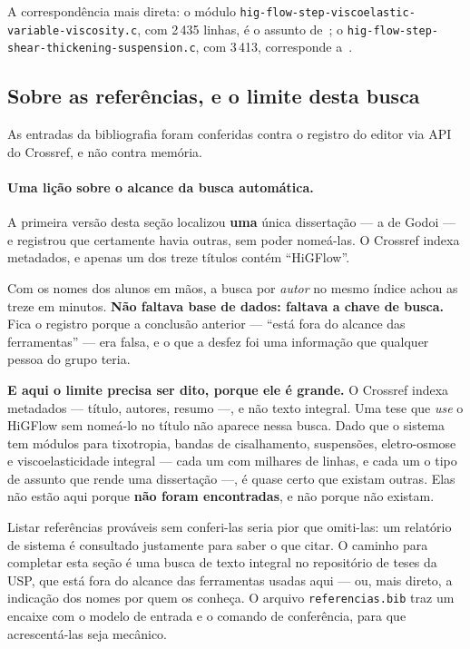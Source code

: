 A correspond\^encia mais direta: o m\'odulo
\texttt{hig-\allowbreak{}flow-\allowbreak{}step-\allowbreak{}viscoelastic-\allowbreak{}variable-\allowbreak{}viscosity.\allowbreak{}c}, com 2\,435 linhas, \'e o
assunto de~\cite{godoi2022}; o \texttt{hig-\allowbreak{}flow-\allowbreak{}step-\allowbreak{}shear-\allowbreak{}thickening-\allowbreak{}suspension.\allowbreak{}c},
com 3\,413, corresponde a~\cite{castillo2025}.

\subsection{Sobre as refer\^encias, e o limite desta busca}

As entradas da bibliografia foram conferidas contra o registro do editor via API
do Crossref, e n\~ao contra mem\'oria.

\paragraph{Uma li\c{c}\~ao sobre o alcance da busca autom\'atica.} A primeira
vers\~ao desta se\c{c}\~ao localizou \textbf{uma} \'unica disserta\c{c}\~ao --- a de
Godoi --- e registrou que certamente havia outras, sem poder nome\'a-las. O
Crossref indexa metadados, e apenas um dos treze t\'itulos cont\'em ``HiGFlow''.

Com os nomes dos alunos em m\~aos, a busca por \emph{autor} no mesmo \'indice
achou as treze em minutos. \textbf{N\~ao faltava base de dados: faltava a chave de
busca.} Fica o registro porque a conclus\~ao anterior --- ``est\'a fora do
alcance das ferramentas'' --- era falsa, e o que a desfez foi uma informa\c{c}\~ao
que qualquer pessoa do grupo teria.

\textbf{E aqui o limite precisa ser dito, porque ele \'e grande.} O Crossref
indexa metadados --- t\'itulo, autores, resumo ---, e n\~ao texto integral. Uma
tese que \emph{use} o HiGFlow sem nome\'a-lo no t\'itulo n\~ao aparece nessa
busca. Dado que o sistema tem m\'odulos para tixotropia, bandas de cisalhamento,
suspens\~oes, eletro-osmose e viscoelasticidade integral --- cada um com milhares
de linhas, e cada um o tipo de assunto que rende uma disserta\c{c}\~ao ---, \'e
quase certo que existam outras. Elas n\~ao est\~ao aqui porque \textbf{n\~ao foram
encontradas}, e n\~ao porque n\~ao existam.

Listar refer\^encias prov\'aveis sem conferi-las seria pior que omiti-las: um
relat\'orio de sistema \'e consultado justamente para saber o que citar. O
caminho para completar esta se\c{c}\~ao \'e uma busca de texto integral no
reposit\'orio de teses da USP, que est\'a fora do alcance das ferramentas usadas
aqui --- ou, mais direto, a indica\c{c}\~ao dos nomes por quem os conhe\c{c}a.
O arquivo \texttt{referencias.bib} traz um encaixe com o modelo de entrada e o
comando de confer\^encia, para que acrescent\'a-las seja mec\^anico.


